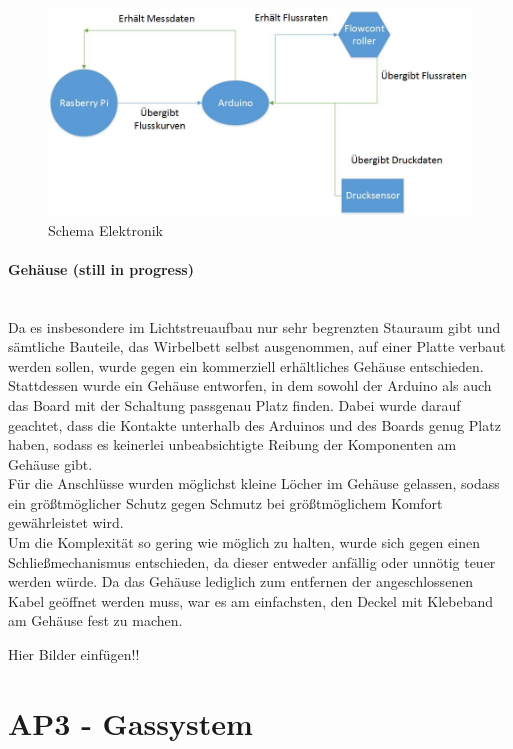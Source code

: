 \begin{figure}[h]
	\begin{center}
		\includegraphics[scale=0.6]{Schema_Elektronik.jpg}
		\caption{Schema Elektronik}
	\end{center}
\end{figure}


\paragraph{Gehäuse (still in progress)} 
\hfill \\
Da es insbesondere im Lichtstreuaufbau nur sehr begrenzten Stauraum gibt und sämtliche Bauteile, das Wirbelbett selbst ausgenommen, auf einer Platte verbaut werden sollen, wurde gegen ein kommerziell erhältliches Gehäuse entschieden. \\ 
Stattdessen wurde ein Gehäuse entworfen, in dem sowohl der Arduino als auch das Board mit der Schaltung passgenau Platz finden. Dabei wurde darauf geachtet, dass die Kontakte unterhalb des Arduinos und des Boards genug Platz haben, sodass es keinerlei unbeabsichtigte Reibung der Komponenten am Gehäuse gibt. \\
Für die Anschlüsse wurden möglichst kleine Löcher im Gehäuse gelassen, sodass ein größtmöglicher Schutz gegen Schmutz bei größtmöglichem Komfort gewährleistet wird. \\
Um die Komplexität so gering wie möglich zu halten, wurde sich gegen einen Schließmechanismus entschieden, da dieser entweder anfällig oder unnötig teuer werden würde. Da das Gehäuse lediglich zum entfernen der angeschlossenen Kabel geöffnet werden muss, war es am einfachsten, den Deckel mit Klebeband am Gehäuse fest zu machen.

Hier Bilder einfügen!!

\newpage

\section{AP3 - Gassystem}

